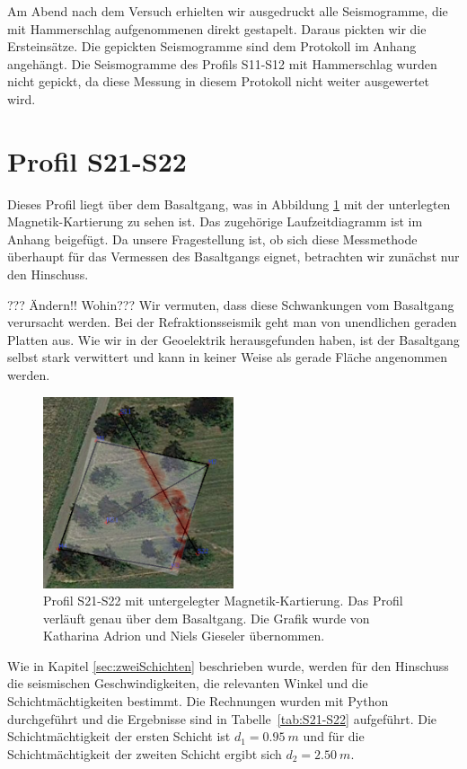 Am Abend nach dem Versuch erhielten wir ausgedruckt alle Seismogramme, die mit Hammerschlag aufgenommenen direkt gestapelt. Daraus pickten wir die Ersteinsätze. Die gepickten Seismogramme sind dem Protokoll im Anhang angehängt. Die Seismogramme des Profils S11-S12 mit Hammerschlag wurden nicht gepickt, da diese Messung in diesem Protokoll nicht weiter ausgewertet wird.

\section{Profil S21-S22 }

Dieses Profil liegt über dem Basaltgang, was in Abbildung \ref{fig:Kartierung} mit der unterlegten Magnetik-Kartierung zu sehen ist. Das zugehörige Laufzeitdiagramm ist im Anhang beigefügt. Da unsere Fragestellung ist, ob sich diese Messmethode überhaupt für das Vermessen des Basaltgangs eignet, betrachten wir zunächst nur den Hinschuss.


??? Ändern!! Wohin???
Wir vermuten, dass diese Schwankungen vom Basaltgang verursacht werden. Bei der Refraktionsseismik geht man von unendlichen geraden Platten aus. Wie wir in der Geoelektrik herausgefunden haben, ist der Basaltgang selbst stark verwittert und kann in keiner Weise als gerade Fläche angenommen werden.

\begin{figure}[!ht]
 \centering
 \includegraphics[width=0.5\textwidth]{fig/Seismik_kartierung}
 \caption[Profil S21-S22 mit untergelegter Magnetik-Kartierung]{Profil S21-S22 mit untergelegter Magnetik-Kartierung. Das Profil verläuft genau über dem Basaltgang. Die Grafik wurde von Katharina Adrion und Niels Gieseler übernommen.}
 \label{fig:Kartierung}
\end{figure}

Wie in Kapitel \ref{sec:zweiSchichten} beschrieben wurde, werden für den Hinschuss die seismischen Geschwindigkeiten, die relevanten Winkel und die Schichtmächtigkeiten bestimmt.
Die Rechnungen wurden mit Python durchgeführt und die Ergebnisse sind in Tabelle~\ref{tab:S21-S22} aufgeführt.
Die Schichtmächtigkeit der ersten Schicht ist $d_1 =\SI{0.95}{m}$ und für die Schichtmächtigkeit der zweiten Schicht ergibt sich $d_2 = \SI{2.50}{m}$.

